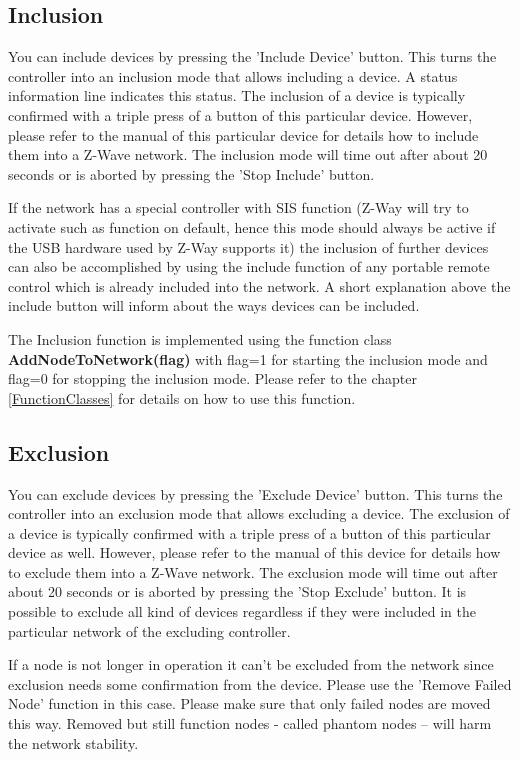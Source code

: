 \subsection{Inclusion}

 You can include devices by pressing the 'Include Device' button. This turns the 
controller into an inclusion mode that allows including a device.  A status information 
line indicates this status. The inclusion of a device is typically confirmed with a 
triple press of a button of this particular device. However, please refer to the manual of 
this particular device for details how to include them into a Z-Wave network. The 
inclusion mode will time out after about 20 seconds or is aborted by pressing the 
'Stop Include' button.

If the network has a special controller with SIS function (Z-Way will try to activate 
such as function on default, hence this mode should always be active if the USB 
hardware used by Z-Way supports it) the inclusion of further devices can also be 
accomplished by using the include function of any portable remote control which 
is already included into the network.   A short explanation above the include button 
will inform about the ways devices can be included.

The Inclusion function is implemented using the function class 
{\bf AddNodeToNetwork(flag)} with flag=1 for starting the inclusion mode and 
flag=0 for stopping the  inclusion mode. Please refer to the chapter \ref{FunctionClasses} 
for details on how to use this function.


\subsection{Exclusion}

You can exclude devices by pressing the 'Exclude Device' button. This turns the controller 
into an exclusion mode that allows excluding a device. 
The exclusion of a device is typically confirmed with a triple press of a button of this 
particular device as well. However, please refer to the manual 
of this device for details how to exclude them into a Z-Wave network. The exclusion mode 
will time out after about 20 seconds or is aborted by pressing the 
'Stop Exclude' button.
It is possible to exclude all kind of devices regardless if they were included in the 
particular network of the excluding controller.

If a node is not longer in operation it can’t be excluded from the network since exclusion 
needs some confirmation from the device. Please use the 'Remove Failed Node' function 
in this case. 
Please make sure that only failed nodes are moved this way. Removed but still function 
nodes  - called phantom nodes – will harm the network stability.



